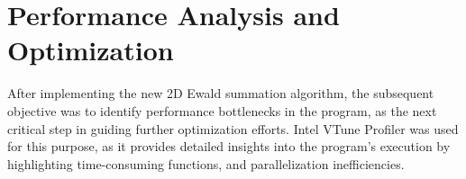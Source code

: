 
\chapter{Performance Analysis and Optimization}

\label{Chapter6}

After implementing the new 2D Ewald summation algorithm, the subsequent objective was to identify performance bottlenecks in the program, as the next critical step in guiding further optimization efforts. Intel VTune Profiler was used for this purpose, as it provides detailed insights into the program’s execution by highlighting time-consuming functions, and parallelization inefficiencies.
